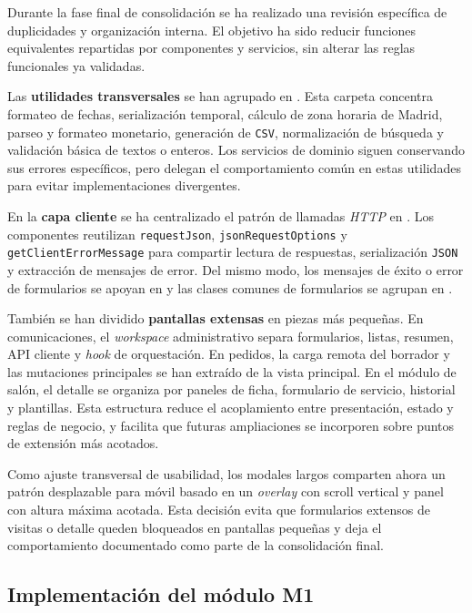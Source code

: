 Durante la fase final de consolidación se ha realizado una revisión específica de duplicidades y organización interna. El objetivo ha sido reducir funciones equivalentes repartidas por componentes y servicios, sin alterar las reglas funcionales ya validadas.

Las \textbf{utilidades transversales} se han agrupado en . Esta carpeta concentra formateo de fechas, serialización temporal, cálculo de zona horaria de Madrid, parseo y formateo monetario, generación de \texttt{CSV}, normalización de búsqueda y validación básica de textos o enteros. Los servicios de dominio siguen conservando sus errores específicos, pero delegan el comportamiento común en estas utilidades para evitar implementaciones divergentes.

En la \textbf{capa cliente} se ha centralizado el patrón de llamadas \textit{HTTP} en . Los componentes reutilizan \texttt{requestJson}, \texttt{jsonRequestOptions} y \texttt{getClientErrorMessage} para compartir lectura de respuestas, serialización \texttt{JSON} y extracción de mensajes de error. Del mismo modo, los mensajes de éxito o error de formularios se apoyan en  y las clases comunes de formularios se agrupan en .

También se han dividido \textbf{pantallas extensas} en piezas más pequeñas. En comunicaciones, el \textit{workspace} administrativo separa formularios, listas, resumen, API cliente y \textit{hook} de orquestación. En pedidos, la carga remota del borrador y las mutaciones principales se han extraído de la vista principal. En el módulo de salón, el detalle se organiza por paneles de ficha, formulario de servicio, historial y plantillas. Esta estructura reduce el acoplamiento entre presentación, estado y reglas de negocio, y facilita que futuras ampliaciones se incorporen sobre puntos de extensión más acotados.

Como ajuste transversal de usabilidad, los modales largos comparten ahora un patrón desplazable para móvil basado en un \textit{overlay} con scroll vertical y panel con altura máxima acotada. Esta decisión evita que formularios extensos de visitas o detalle queden bloqueados en pantallas pequeñas y deja el comportamiento documentado como parte de la consolidación final.



\subsection{Implementación del módulo M1}

